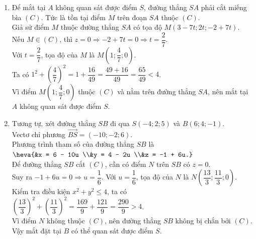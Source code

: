 \begin{bt}
{\begin{enumerate}
Phương trình tham số của đường thẳng $SA$ là $\heva{&x = 3 - 7t \\&y = 2t \\&z = -2 + 7t.}$
\item Để mắt tại $A$ không quan sát được điểm $S$, đường thẳng $SA$ phải cắt miếng bìa $(C)$. Tức là tồn tại điểm $M$ trên đoạn $SA$ thuộc $(C)$.\\
Giả sử điểm $M$ thuộc đường thẳng $SA$ có tọa độ $M(3-7t; 2t; -2+7t)$. \\
Nếu $M \in (C)$, thì $z=0 \Rightarrow -2+7t = 0 \Rightarrow t = \dfrac{2}{7}$.\\
Với $t = \dfrac{2}{7}$, tọa độ của $M$ là $M\left( 1; \dfrac{4}{7}; 0 \right)$.\\
Ta có $1^2 + \left(\dfrac{4}{7}\right)^2 = 1 + \dfrac{16}{49} = \dfrac{49+16}{49} = \dfrac{65}{49} < 4$.\\
Vì điểm $M\left(1; \dfrac{4}{7}; 0\right)$ thuộc $(C)$ và nằm trên đường thẳng $SA$, nên mắt tại $A$ không quan sát được điểm $S$.
\item Tương tự, xét đường thẳng $SB$ đi qua $S(-4;2;5)$ và $B(6;4;-1)$. \\
Vectơ chỉ phương $\overrightarrow{BS} = (-10; -2; 6)$.\\
Phương trình tham số của đường thẳng $SB$ là $\heva{&x = 6 - 10u \\&y = 4 - 2u \\&z = -1 + 6u.}$\\
Để đường thẳng $SB$ cắt $(C)$, cần có điểm $N$ trên $SB$ có $z=0$.\\
Suy ra $-1 + 6u = 0 \Rightarrow u = \dfrac{1}{6}$. Với $u = \dfrac{1}{6}$, tọa độ của $N$ là $N\left( \dfrac{13}{3}; \dfrac{11}{3}; 0 \right)$.\\
Kiểm tra điều kiện $x^2 + y^2 \leq 4$, ta có $\left(\dfrac{13}{3}\right)^2 + \left(\dfrac{11}{3}\right)^2 = \dfrac{169}{9} + \dfrac{121}{9} = \dfrac{290}{9} > 4$.\\
Vì điểm $N$ không thuộc $(C)$, nên đường thẳng $SB$ không bị chắn bởi $(C)$. Vậy mắt đặt tại $B$ có thể quan sát được điểm $S$.
\end{enumerate}
}
\end{bt}

